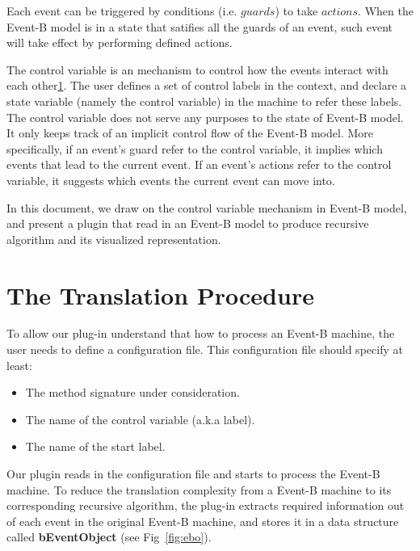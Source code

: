 \documentclass{easychair}
\begin{document}
Each event can be triggered by conditions (i.e. $guards$) to take $actions$. When the Event-B model is in a state that satifies all the guards of an event, such event will take effect by performing defined actions.

The control variable is an mechanism to control how the events interact with each other\ref{}. The user defines a set of control labels in the context, and declare a state variable (namely the control variable) in the machine to refer these labels. The control variable does not serve any purposes to the state of Event-B model. It only keeps track of an implicit control flow of the Event-B model. More specifically, if an event's guard refer to the control variable, it implies which events that lead to the current event. If an event's actions refer to the control variable, it suggests which events the current event can move into. 

In this document, we draw on the control variable mechanism in Event-B model, and present a plugin that read in an Event-B model to produce recursive algorithm and its visualized representation.
 
\section{The Translation Procedure}
To allow our plug-in understand that how to process an Event-B machine, the user needs to define a configuration file. This configuration file should specify at least:
\begin{itemize}
	\item The method signature under consideration.
	\item The name of the control variable (a.k.a label).
	\item The name of the start label.
\end{itemize}

Our plugin reads in the configuration file and starts to process the Event-B machine. To reduce the translation complexity from a Event-B machine to its corresponding recursive algorithm, the plug-in extracts required information out of each event in the original Event-B machine, and stores it in a data structure called \textbf{bEventObject} (see Fig~\ref{fig:ebo}). 
\end{document}
